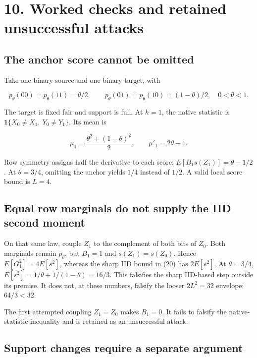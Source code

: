\documentclass[11pt,a4paper]{article}
\begin{document}
\section{10. Worked checks and retained unsuccessful attacks}\label{worked-checks-and-retained-unsuccessful-attacks}

\subsection{The anchor score cannot be omitted}\label{the-anchor-score-cannot-be-omitted}

Take one binary source and one binary target, with

\[
p_\theta(00)=p_\theta(11)=\theta/2,\qquad
p_\theta(01)=p_\theta(10)=(1-\theta)/2,\quad0<\theta<1.
\]

The target is fixed fair and support is full. At \(h=1\), the native statistic is \(\mathbf1\{X_0\ne X_1,\ Y_0\ne Y_1\}\). Its mean is

\[
\mu_1=\frac{\theta^2+(1-\theta)^2}{2},\qquad \mu'_1=2\theta-1.
\]

Row symmetry assigns half the derivative to each score: \(E[B_1s(Z_1)]=\theta-1/2\). At \(\theta=3/4\), omitting the anchor yields \(1/4\) instead of \(1/2\). A valid local score bound is \(L=4\).

\subsection{Equal row marginals do not supply the IID second moment}\label{equal-row-marginals-do-not-supply-the-iid-second-moment}

On that same law, couple \(Z_1\) to the complement of both bits of \(Z_0\). Both marginals remain \(p_\theta\), but \(B_1=1\) and \(s(Z_1)=s(Z_0)\). Hence \(E[G_1^2]=4E[s^2]\), whereas the sharp IID bound in (20) has \(2E[s^2]\). At \(\theta=3/4\), \(E[s^2]=1/\theta+1/(1-\theta)=16/3\). This falsifies the sharp IID-based step outside its premise. It does not, at these numbers, falsify the looser \(2L^2=32\) envelope: \(64/3<32\).

The first attempted coupling \(Z_1=Z_0\) makes \(B_1=0\). It fails to falsify the native-statistic inequality and is retained as an unsuccessful attack.

\subsection{Support changes require a separate argument}\label{support-changes-require-a-separate-argument}
\end{document}

